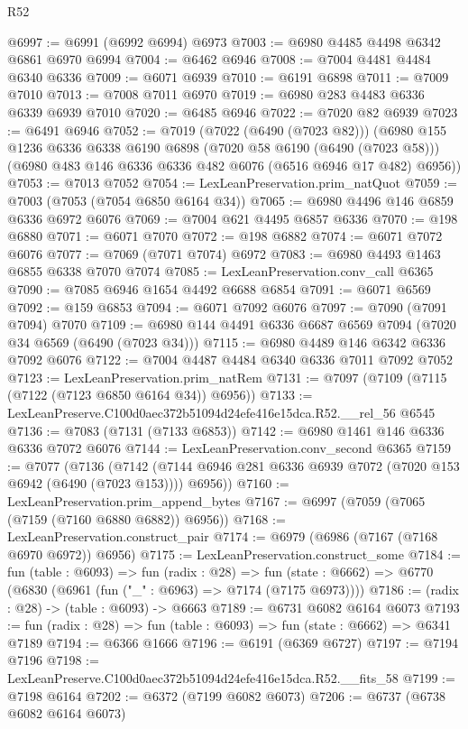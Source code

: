 \begin{lexlean}{R52}
\begin{coremodule}
@6997 := @6991 (@6992 @6994) @6973
@7003 := @6980 @4485 @4498 @6342 @6861 @6970 @6994
@7004 := @6462 @6946
@7008 := @7004 @4481 @4484 @6340 @6336
@7009 := @6071 @6939
@7010 := @6191 @6898
@7011 := @7009 @7010
@7013 := @7008 @7011 @6970
@7019 := @6980 @283 @4483 @6336 @6339 @6939 @7010
@7020 := @6485 @6946
@7022 := @7020 @82 @6939
@7023 := @6491 @6946
@7052 := @7019
    (@7022 (@6490 (@7023 @82)))
    (@6980
      @155
      @1236
      @6336
      @6338
      @6190
      @6898
      (@7020 @58 @6190 (@6490 (@7023 @58)))
      (@6980 @483 @146 @6336 @6336 @482 @6076 (@6516 @6946 @17 @482) @6956))
@7053 := @7013 @7052
@7054 := LexLeanPreservation.prim_natQuot
@7059 := @7003 (@7053 (@7054 @6850 @6164 @34))
@7065 := @6980 @4496 @146 @6859 @6336 @6972 @6076
@7069 := @7004 @621 @4495 @6857 @6336
@7070 := @198 @6880
@7071 := @6071 @7070
@7072 := @198 @6882
@7074 := @6071 @7072 @6076
@7077 := @7069 (@7071 @7074) @6972
@7083 := @6980 @4493 @1463 @6855 @6338 @7070 @7074
@7085 := LexLeanPreservation.conv_call @6365
@7090 := @7085 @6946 @1654 @4492 @6688 @6854
@7091 := @6071 @6569
@7092 := @159 @6853
@7094 := @6071 @7092 @6076
@7097 := @7090 (@7091 @7094) @7070
@7109 := @6980 @144 @4491 @6336 @6687 @6569 @7094 (@7020 @34 @6569 (@6490 (@7023 @34)))
@7115 := @6980 @4489 @146 @6342 @6336 @7092 @6076
@7122 := @7004 @4487 @4484 @6340 @6336 @7011 @7092 @7052
@7123 := LexLeanPreservation.prim_natRem
@7131 := @7097 (@7109 (@7115 (@7122 (@7123 @6850 @6164 @34)) @6956))
@7133 := LexLeanPreserve.C100d0aec372b51094d24efe416e15dca.R52.__rel_56 @6545
@7136 := @7083 (@7131 (@7133 @6853))
@7142 := @6980 @1461 @146 @6336 @6336 @7072 @6076
@7144 := LexLeanPreservation.conv_second @6365
@7159 := @7077
    (@7136
      (@7142 (@7144 @6946 @281 @6336 @6939 @7072 (@7020 @153 @6942 (@6490 (@7023 @153)))) @6956))
@7160 := LexLeanPreservation.prim_append_bytes
@7167 := @6997 (@7059 (@7065 (@7159 (@7160 @6880 @6882)) @6956))
@7168 := LexLeanPreservation.construct_pair
@7174 := @6979 (@6986 (@7167 (@7168 @6970 @6972)) @6956)
@7175 := LexLeanPreservation.construct_some
@7184 := fun (table : @6093) =>
  fun (radix : @28) =>
  fun (state : @6662) => @6770 (@6830 (@6961 (fun ("_" : @6963) => @7174 (@7175 @6973))))
@7186 := (radix : @28) -> (table : @6093) -> @6663
@7189 := @6731 @6082 @6164 @6073
@7193 := fun (radix : @28) => fun (table : @6093) => fun (state : @6662) => @6341 @7189
@7194 := @6366 @1666
@7196 := @6191 (@6369 @6727)
@7197 := @7194 @7196
@7198 := LexLeanPreserve.C100d0aec372b51094d24efe416e15dca.R52.__fits_58
@7199 := @7198 @6164
@7202 := @6372 (@7199 @6082 @6073)
@7206 := @6737 (@6738 @6082 @6164 @6073)

\end{coremodule}
\end{lexlean}
